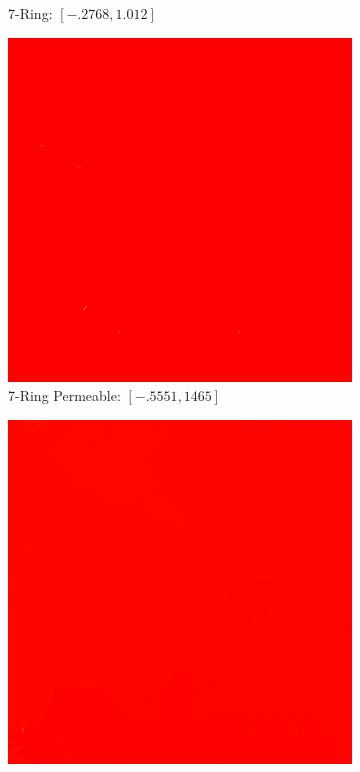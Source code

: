 \documentclass[11pt]{article}       %
\begin{document}
\begin{figure}
\begin{subfigure}[b]{.4\columnwidth}
		\caption{7-Ring: $[-.2768, 1.012]$}
	\end{subfigure}
	\begin{subfigure}[b]{.4\columnwidth}
		\includegraphics[width=\textwidth]{Figures/diff_7_rings_permeable}
		\caption{7-Ring Permeable: $[-.5551, 1465]$}
	\end{subfigure}
	\begin{subfigure}[b]{.4\columnwidth}
		\includegraphics[width=\textwidth]{Figures/diff_cloudy}

\end{subfigure}
\end{figure}
\end{document}
